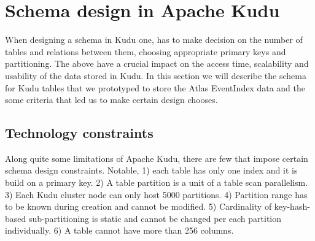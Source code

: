 \documentclass{webofc}
\begin{document}
\section{Schema design in Apache Kudu}
\label{sec-5}
When designing a schema in Kudu one, has to make decision on the number of tables and relations between them, choosing appropriate primary keys and partitioning. The above have a crucial impact on the access time, scalability and usability of the data stored in Kudu. \newline
In this section we will describe the schema for Kudu tables that we prototyped to store the Atlas EventIndex data and the some criteria that led us to make certain design chooses.
\subsection{Technology constraints}
\label{sec-5-cons}
Along quite some limitations \cite{KuduLimitations} of Apache Kudu, there are few that impose certain schema design constraints. Notable, 1) each table has only one index and it is build on a primary key. 2) A table partition is a unit of a table scan parallelism. 3) Each Kudu cluster node can only host 5000 partitions. 4) Partition range has to be known during creation and cannot be modified. 5) Cardinality of key-hash-based sub-partitioning is static and cannot be changed per each partition individually. 6) A table cannot have more than 256 columns. 
\end{document}
